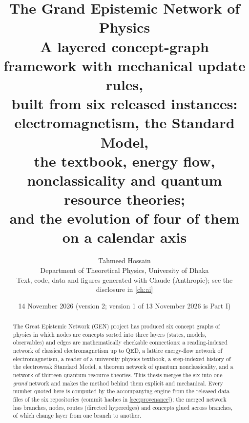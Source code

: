 \documentclass[11pt,a4paper,twoside,openany]{report}
\title{\textbf{The Grand Epistemic Network of Physics}\\[4pt]
\large A layered concept-graph framework with mechanical update rules,\\ built from six released instances: electromagnetism, the Standard Model,\\ the textbook, energy flow, nonclassicality and quantum resource theories;\\ and the evolution of four of them on a calendar axis}
\author{Tahmeed Hossain\\ \small Department of Theoretical Physics, University of Dhaka\\[6pt]
\small Text, code, data and figures generated with Claude (Anthropic); see the disclosure in \cref{ch:ai}}
\date{14 November 2026 (version 2; version 1 of 13 November 2026 is Part I)}
\theoremstyle{plain}
\theoremstyle{definition}
\theoremstyle{remark}
\begin{document}
\maketitle

\begin{abstract}
\noindent
The Great Epistemic Network (GEN) project has produced six concept graphs of physics in which nodes are concepts sorted into three layers (states, models, observables) and edges are mathematically checkable connections: a reading-indexed network of classical electromagnetism up to QED, a lattice energy-flow network of electromagnetism, a reader of a university physics textbook, a step-indexed history of the electroweak Standard Model, a theorem network of quantum nonclassicality, and a network of thirteen quantum resource theories. This thesis merges the six into one \emph{grand} network and makes the method behind them explicit and mechanical. Every number quoted here is computed by the accompanying engine from the released data files of the six repositories (commit hashes in \cref{sec:provenance}); the merged network has \NnBranches{} branches, \NnNodes{} nodes, \NnRoutes{} routes (directed hyperedges) and \NnConcepts{} concepts glued across branches, \NnFlips{} of which change layer from one branch to another.


\end{abstract}
\end{document}
